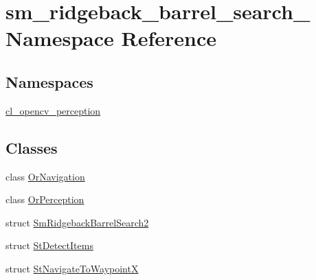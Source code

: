 \hypertarget{namespacesm__ridgeback__barrel__search__2}{}\section{sm\+\_\+ridgeback\+\_\+barrel\+\_\+search\+\_ Namespace Reference}
\label{namespacesm__ridgeback__barrel__search__2}
\subsection*{Namespaces}
\begin{DoxyCompactItemize}
\item 
 \hyperlink{namespacesm__ridgeback__barrel__search__2_1_1cl__opencv__perception}{cl\+\_\+opencv\+\_\+perception}
\end{DoxyCompactItemize}
\subsection*{Classes}
\begin{DoxyCompactItemize}
\item 
class \hyperlink{classsm__ridgeback__barrel__search__2_1_1OrNavigation}{Or\+Navigation}
\item 
class \hyperlink{classsm__ridgeback__barrel__search__2_1_1OrPerception}{Or\+Perception}
\item 
struct \hyperlink{structsm__ridgeback__barrel__search__2_1_1SmRidgebackBarrelSearch2}{Sm\+Ridgeback\+Barrel\+Search2}
\item 
struct \hyperlink{structsm__ridgeback__barrel__search__2_1_1StDetectItems}{St\+Detect\+Items}
\item 
struct \hyperlink{structsm__ridgeback__barrel__search__2_1_1StNavigateToWaypointX}{St\+Navigate\+To\+WaypointX}
\end{DoxyCompactItemize}

